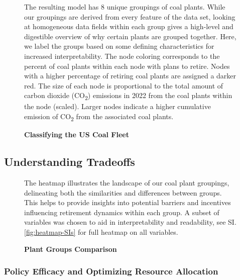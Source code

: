 \begin{figure}[H]
    
    \caption{\textbf{Classifying the US Coal Fleet}}
    \medskip
    \footnotesize
    The resulting model has 8 unique groupings of coal plants. While our groupings are derived from every feature of the data set, looking at homogeneous data fields within each group gives a high-level and digestible overview of why certain plants are grouped together. Here, we label the groups based on some defining characteristics for increased interpretability.
    The node coloring corresponds to the percent of coal plants within each node with plans to retire. Nodes with a higher percentage of retiring coal plants are assigned a darker red. The size of each node is proportional to the total amount of carbon dioxide (CO\textsubscript{2}) emissions in 2022 from the coal plants within the node (scaled). 
    Larger nodes indicate a higher cumulative emission of CO\textsubscript{2} from the associated coal plants.
    \label{fig:coal-fleet-partition}
\end{figure}



\subsection{Understanding Tradeoffs}

\begin{figure}[H]
      
    \caption{\textbf{Plant Groups Comparison}}
    \medskip
    \footnotesize
    The heatmap illustrates the landscape of our coal plant groupings, delineating both the similarities and differences between groups. This helps to provide insights into potential barriers and incentives influencing retirement dynamics within each group.
    A subset of variables was chosen to aid in interpretability and readability, see SI.\ref{fig:heatmap-SIs} for full heatmap on all variables.
    \label{fig:heatmap}
\end{figure}

\subsubsection{Policy Efficacy and Optimizing Resource Allocation}

